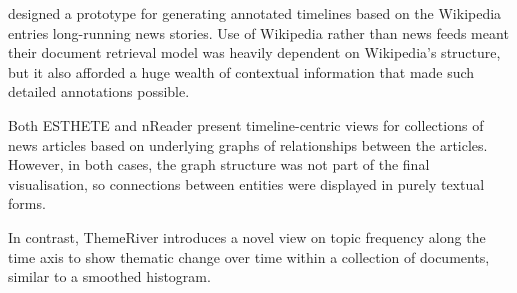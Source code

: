 \citet{ExploringLongRunningNewsStoriesUsingWikipedia} designed a prototype for generating annotated timelines based on the Wikipedia entries long-running news stories. Use of Wikipedia rather than news feeds meant their document retrieval model was heavily dependent on Wikipedia's structure, but it also afforded a huge wealth of contextual information that made such detailed annotations possible.

Both ESTHETE \citep{ESTHETE} and nReader \citep{Nreader} present timeline-centric views for collections of news articles based on underlying graphs of relationships between the articles. However, in both cases, the graph structure was not part of the final visualisation, so connections between entities were displayed in purely textual forms.

In contrast, ThemeRiver \citep{ThemeRiver} introduces a novel view on topic frequency along the time axis to show thematic change over time within a collection of documents, similar to a smoothed histogram. 

